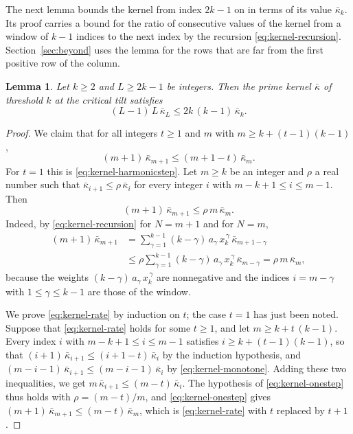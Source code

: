 \documentclass{amsart}
\newtheorem{lemma}[theorem]{Lemma}
\theoremstyle{definition}
\theoremstyle{remark}
\numberwithin{equation}{section}
\begin{document}
The next lemma bounds the kernel from index $2k-1$ on in terms of its value
$\bar\kappa_k$. Its proof carries a bound for the ratio of consecutive values
of the kernel from a window of $k-1$ indices to the next index by the
recursion \eqref{eq:kernel-recursion}. Section~\ref{sec:beyond} uses the
lemma for the rows that are far from the first positive row of the column.

\begin{lemma}\label{lem:quadratic}
Let $k\ge2$ and $L\ge2k-1$ be integers. Then the prime kernel $\bar\kappa$
of threshold $k$ at the critical tilt satisfies
\[
(L-1)\,L\,\bar\kappa_L\le2k\,(k-1)\,\bar\kappa_k .
\]
\end{lemma}

\begin{proof}
We claim that for all integers $t\ge1$ and $m$ with
$m\ge k+(t-1)(k-1)$,
\begin{equation}\label{eq:kernel-rate}
(m+1)\,\bar\kappa_{m+1}\le(m+1-t)\,\bar\kappa_m .
\end{equation}
For $t=1$ this is \eqref{eq:kernel-harmonicstep}. Let
$m\ge k$ be an integer and $\rho$ a real number such that
$\bar\kappa_{i+1}\le\rho\,\bar\kappa_i$ for every integer $i$ with
$m-k+1\le i\le m-1$. Then
\begin{equation}\label{eq:kernel-onestep}
(m+1)\,\bar\kappa_{m+1}\le\rho\,m\,\bar\kappa_m .
\end{equation}
Indeed, by \eqref{eq:kernel-recursion} for $N=m+1$ and for $N=m$,
\begin{align*}
(m+1)\,\bar\kappa_{m+1}
&=\sum_{\gamma=1}^{k-1}(k-\gamma)\,a_\gamma\,x_k^{\,\gamma}\,
\bar\kappa_{m+1-\gamma}\\
&\le\rho\sum_{\gamma=1}^{k-1}(k-\gamma)\,a_\gamma\,x_k^{\,\gamma}\,
\bar\kappa_{m-\gamma}=\rho\,m\,\bar\kappa_m ,
\end{align*}
because the weights $(k-\gamma)\,a_\gamma\,x_k^{\,\gamma}$ are nonnegative
and the indices $i=m-\gamma$ with $1\le\gamma\le k-1$ are those of the
window.

We prove \eqref{eq:kernel-rate} by induction on $t$; the case $t=1$ has
just been noted. Suppose that \eqref{eq:kernel-rate} holds for some
$t\ge1$, and let $m\ge k+t\,(k-1)$. Every index $i$ with
$m-k+1\le i\le m-1$ satisfies $i\ge k+(t-1)(k-1)$, so that
$(i+1)\,\bar\kappa_{i+1}\le(i+1-t)\,\bar\kappa_i$ by the induction
hypothesis, and $(m-i-1)\,\bar\kappa_{i+1}\le(m-i-1)\,\bar\kappa_i$ by
\eqref{eq:kernel-monotone}. Adding these two inequalities, we get
$m\,\bar\kappa_{i+1}\le(m-t)\,\bar\kappa_i$. The hypothesis of
\eqref{eq:kernel-onestep} thus holds with $\rho=(m-t)/m$, and
\eqref{eq:kernel-onestep} gives
$(m+1)\,\bar\kappa_{m+1}\le(m-t)\,\bar\kappa_m$, which is
\eqref{eq:kernel-rate} with $t$ replaced by $t+1$.


\end{proof}
\end{document}
